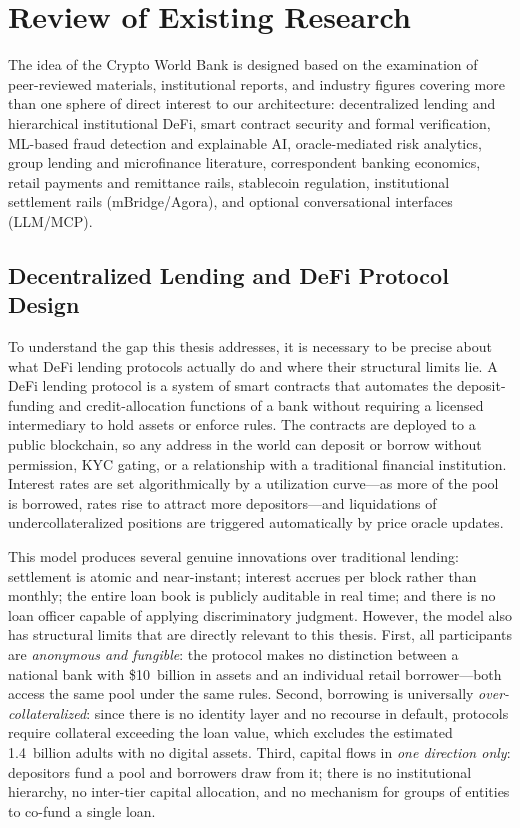 \documentclass[12pt,a4paper]{report}
\begin{document}
\section{Review of Existing Research}

The idea of the Crypto World Bank is designed based on the examination of peer-reviewed materials, institutional reports, and industry figures covering more than one sphere of direct interest to our architecture: decentralized lending and hierarchical institutional DeFi, smart contract security and formal verification, ML-based fraud detection and explainable AI, oracle-mediated risk analytics, group lending and microfinance literature, correspondent banking economics, retail payments and remittance rails, stablecoin regulation, institutional settlement rails (mBridge/Agora), and optional conversational interfaces (LLM/MCP).

\subsection{Decentralized Lending and DeFi Protocol Design}

To understand the gap this thesis addresses, it is necessary to be precise about what DeFi lending protocols actually do and where their structural limits lie. A DeFi lending protocol is a system of smart contracts that automates the deposit-funding and credit-allocation functions of a bank without requiring a licensed intermediary to hold assets or enforce rules. The contracts are deployed to a public blockchain, so any address in the world can deposit or borrow without permission, KYC gating, or a relationship with a traditional financial institution. Interest rates are set algorithmically by a utilization curve---as more of the pool is borrowed, rates rise to attract more depositors---and liquidations of undercollateralized positions are triggered automatically by price oracle updates.

This model produces several genuine innovations over traditional lending: settlement is atomic and near-instant; interest accrues per block rather than monthly; the entire loan book is publicly auditable in real time; and there is no loan officer capable of applying discriminatory judgment. However, the model also has structural limits that are directly relevant to this thesis. First, all participants are \textit{anonymous and fungible}: the protocol makes no distinction between a national bank with \$10~billion in assets and an individual retail borrower---both access the same pool under the same rules. Second, borrowing is universally \textit{over-collateralized}: since there is no identity layer and no recourse in default, protocols require collateral exceeding the loan value, which excludes the estimated 1.4~billion adults with no digital assets. Third, capital flows in \textit{one direction only}: depositors fund a pool and borrowers draw from it; there is no institutional hierarchy, no inter-tier capital allocation, and no mechanism for groups of entities to co-fund a single loan.
\end{document}
